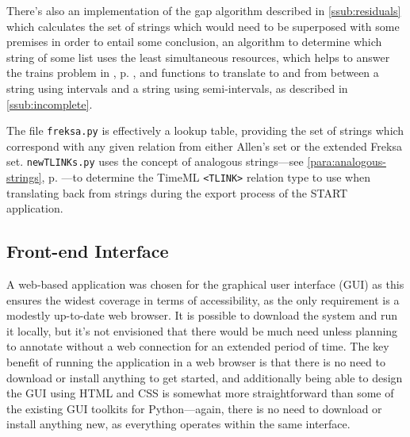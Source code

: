 \documentclass[a4paper,12pt,leqno]{article}
\begin{document}
There's also an implementation of the gap algorithm described in \cref{ssub:residuals} which calculates the set of strings which would need to be superposed with some premises in order to entail some conclusion, an algorithm to determine which string of some list uses the least simultaneous resources, which helps to answer the trains problem in , p. \pageref{tab:train-problem-clues}, and functions to translate to and from between a string using intervals and a string using semi-intervals, as described in \cref{ssub:incomplete}.

The file \verb|freksa.py| is effectively a lookup table, providing the set of strings which correspond with any given relation from either Allen's set or the extended Freksa set. \verb|newTLINKs.py| uses the concept of analogous strings---see \cref{para:analogous-strings}, p. \pageref{para:analogous-strings}---to determine the TimeML \verb|<TLINK>| relation type to use when translating back from strings during the export process of the START application.

\subsection{Front-end Interface}\label{sub:frontend}
A web-based application was chosen for the graphical user interface (GUI) as this ensures the widest coverage in terms of accessibility, as the only requirement is a modestly up-to-date web browser. It is possible to download the system and run it locally, but it's not envisioned that there would be much need unless planning to annotate without a web connection for an extended period of time. The key benefit of running the application in a web browser is that there is no need to download or install anything to get started, and additionally being able to design the GUI using HTML and CSS is somewhat more straightforward than some of the existing GUI toolkits for Python---again, there is no need to download or install anything new, as everything operates within the same interface.
\end{document}
